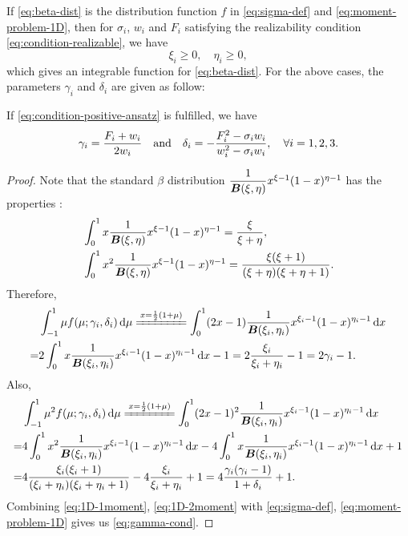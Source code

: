 If \eqref{eq:beta-dist} is the distribution function $f$ in 
\eqref{eq:sigma-def} and \eqref{eq:moment-problem-1D}, then for
$\sigma_i$, $w_i$ and $F_i$ satisfying the realizability condition 
\eqref{eq:condition-realizable}, we have  
\[
\xi_i \geq 0,\quad \eta_i \geq 0,
\]
which gives an integrable function for \eqref{eq:beta-dist}.
For the above cases, the parameters $\gamma_i$ and $\delta_i$ are given 
as follow:
\begin{lemma}\label{lem:gamma-delta}
  If \eqref{eq:condition-positive-ansatz} is fulfilled, we have
  \begin{equation}\label{eq:gamma-cond}
    \gamma_i = \frac{F_i  + w_i }{ 2 w_i} \quand 
    \delta_i = -\frac{ F_i^2 
      - \sigma_i w_i}{w_i^2 - \sigma_i w_i},\quad
    \forall i = 1,2,3.
  \end{equation}
\end{lemma}
\begin{proof}
  Note that the standard $\beta$ distribution
  $\dfrac1{\boldsymbol{B}(\xi,\eta)} x^{\xi - 1} (1 - x)^{\eta - 1}$ has the
  properties \cite{johnson1970discrete}:
  \[
  \begin{split}
    & \int_0^1 x \dfrac1{\boldsymbol{B}(\xi,\eta)} x^{\xi - 1}
    (1 - x)^{\eta - 1} = \dfrac{\xi}{\xi + \eta}, \\
    & \int_0^1 x^2 \dfrac1{\boldsymbol{B}(\xi,\eta)} x^{\xi - 1}
    (1 - x)^{\eta - 1} = \dfrac{\xi (\xi + 1)}
    {(\xi + \eta)(\xi + \eta + 1)}.
  \end{split}
  \]
  Therefore,
  \begin{equation}\label{eq:1D-1moment}
    \begin{split}
      & \int_{-1}^1 \mu f(\mu;\gamma_i,\delta_i)
      \dd\mu  
      \xlongequal{x = \frac12 (1 + \mu)} 
      \int_0^1 (2x - 1) \dfrac1{\Beta(\xi_i, \eta_i)} 
      x^{\xi_i - 1} (1-x)^{\eta_i - 1} \dd x\\
      = & 2\int_0^1 x \dfrac1{\Beta(\xi_i, \eta_i)}
      x^{\xi_i - 1} (1 - x)^{\eta_i - 1} \dd x
      - 1 
      = 2 \dfrac{\xi_i}{\xi_i + \eta_i} - 1 
      = 2 \gamma_i - 1.
    \end{split}
  \end{equation}
  Also,
  \begin{equation}\label{eq:1D-2moment}
    \begin{split}
      & \int_{-1}^1 \mu^2 f(\mu;\gamma_i,\delta_i)
      \dd\mu  
      \xlongequal{x = \frac12 (1 + \mu)} 
      \int_0^1 (2x - 1)^2 \dfrac1{\Beta(\xi_i, \eta_i)} 
      x^{\xi_i - 1} (1-x)^{\eta_i - 1} \dd x\\
      = & 4\int_0^1 x^2 \dfrac1{\Beta(\xi_i, \eta_i)}
      x^{\xi_i - 1} (1 - x)^{\eta_i - 1} \dd x
      - 4\int_0^1 x \dfrac1{\Beta(\xi_i, \eta_i)}
      x^{\xi_i - 1} (1 - x)^{\eta_i - 1} \dd x
      + 1 \\
      = & 4 \dfrac{\xi_i (\xi_i + 1)}{(\xi_i + \eta_i)
        (\xi_i + \eta_i + 1)} -4 \dfrac{\xi_i}{\xi_i + \eta_i}
      + 1 
      = 4 \dfrac{\gamma_i(\gamma_i - 1)}{1 + \delta_i} + 1.
    \end{split}
  \end{equation}
  Combining \eqref{eq:1D-1moment}, \eqref{eq:1D-2moment} with
  \eqref{eq:sigma-def}, \eqref{eq:moment-problem-1D}  
  gives us \eqref{eq:gamma-cond}.
\end{proof}
